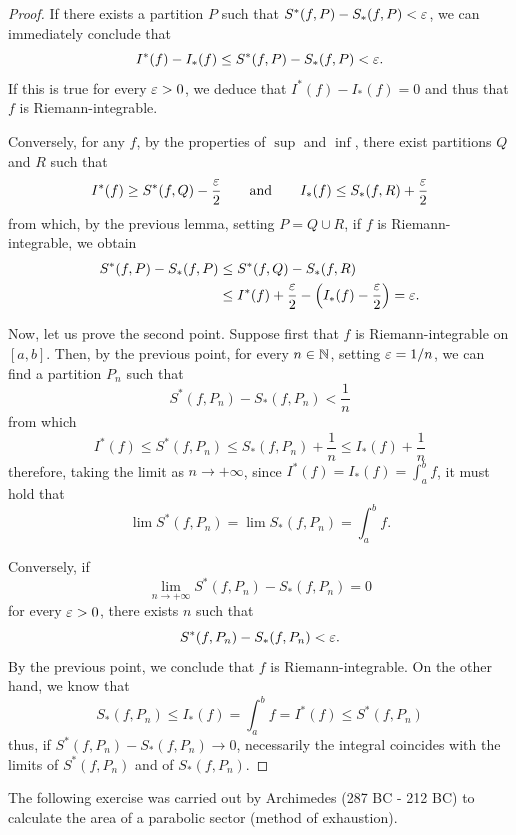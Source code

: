 \begin{proof}
If there exists a partition $P$ such that $S^*(f,P)-S_*(f,P) < \varepsilon$, we can
immediately conclude that
\[
I^*(f) - I_*(f) \le S^*(f,P) - S_*(f,P) < \varepsilon.
\]
If this is true for every $\varepsilon >0$, we deduce that $I^*(f) - I_*(f) = 0$ and
thus that $f$ is Riemann-integrable.

Conversely, for any $f$, by the properties
of $\sup$ and $\inf$,
there exist partitions $Q$ and $R$ such that
\[
  I^*(f) \ge S^*(f,Q) - \frac{\varepsilon} 2
  \qquad\text{and}\qquad
  I_*(f) \le S_*(f,R) + \frac{\varepsilon} 2
\]
from which, by the previous lemma, setting $P=Q\cup R$,
if $f$ is Riemann-integrable,
we obtain
\begin{align*}
S^*(f,P)-S_*(f,P) 
&\le S^*(f,Q) - S_*(f,R) \\
&\le I^*(f) + \frac{\varepsilon} 2 - {\left( I_*(f) - \frac {\varepsilon} 2 \right)} = \varepsilon.
\end{align*}

Now, let us prove the second point.
Suppose first that $f$ is Riemann-integrable on $[a,b]$.
Then, by the previous point, for every $n\in {\mathbb N}$, setting $\varepsilon=1/n$, we can
find a partition $P_n$ such that
\[
  S^*(f,P_n) - S_*(f,P_n) < \frac 1 n
\]
from which
\[
  I^*(f) \le S^*(f,P_n) \le S_*(f,P_n) + \frac 1 n
   \le I_*(f) + \frac 1 n
\]
therefore, taking the limit as $n\to +\infty$,
since $I^*(f) = I_*(f) = \int_a^b f$, it must hold that
\[
  \lim S^*(f,P_n) = \lim S_*(f,P_n) = \int_a^b f.
\]

Conversely, if
\[
 \lim_{n\to +\infty} S^*(f,P_n) - S_*(f,P_n) = 0
\]
for every $\varepsilon>0$, there exists $n$ such that
\[
  S^*(f,P_n) - S_*(f,P_n) < \varepsilon.
\]
By the previous point, we conclude that $f$ is Riemann-integrable.
On the other hand, we know that
\[
  S_*(f,P_n) \le I_*(f) = \int_a^b f = I^*(f) \le S^*(f,P_n)
\]
thus, if $S^*(f,P_n) - S_*(f,P_n) \to 0$, necessarily
the integral coincides with the limits of $S^*(f,P_n)$ and of
$S_*(f,P_n)$.
\end{proof}

The following exercise was carried out by Archimedes (287 BC - 212 BC) 
to calculate the area of a parabolic sector (method of exhaustion).


